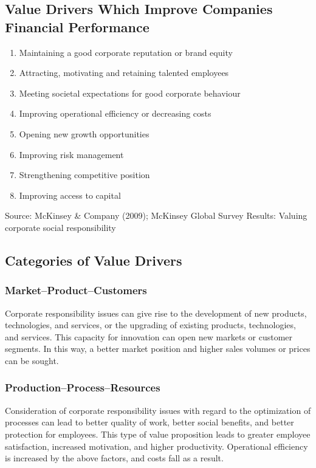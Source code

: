 \documentclass[11pt]{article}
\theoremstyle{definition}
\begin{document}
\subsection{Value Drivers Which Improve Companies Financial Performance}
\begin{enumerate}
	\item Maintaining a good corporate reputation or brand equity
	\item Attracting, motivating and retaining talented employees
	\item Meeting societal expectations for good corporate behaviour
	\item Improving operational efficiency or decreasing costs
	\item Opening new growth opportunities
	\item Improving risk management
	\item Strengthening competitive position
	\item Improving access to capital
\end{enumerate}
Source: McKinsey \& Company (2009); McKinsey Global Survey Results: Valuing corporate social responsibility

\subsection{Categories of Value Drivers}
\subsubsection{Market–Product–Customers}
Corporate responsibility issues can give rise to the development of new products, technologies, and services, or the upgrading of existing products, technologies, and services. This capacity for innovation can open new markets or customer segments. In this way, a better market position and higher sales volumes or prices can be sought.

\subsubsection{Production–Process–Resources}
Consideration of corporate responsibility issues with regard to the optimization of processes can lead to better quality of work, better social benefits, and better protection for employees. This type of value proposition leads to greater employee satisfaction, increased motivation, and higher productivity. Operational efficiency is increased by the above factors, and costs fall as a result.
\end{document}
